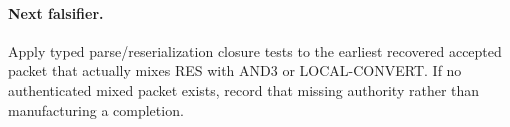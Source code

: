 \documentclass[11pt]{article}
\begin{document}
\paragraph{Next falsifier.}
Apply typed parse/reserialization closure tests to the earliest recovered
accepted packet that actually mixes RES with AND3 or LOCAL-CONVERT.  If no
authenticated mixed packet exists, record that missing authority rather than
manufacturing a completion.

\end{document}
